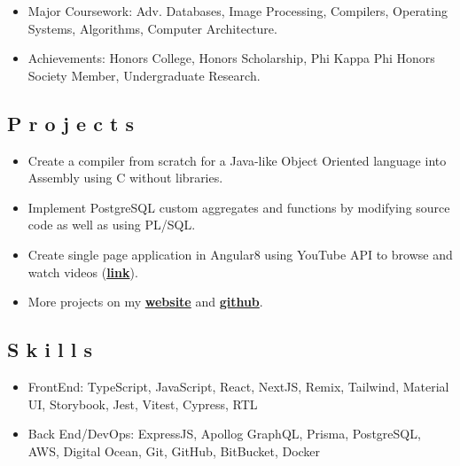 \documentclass{resume}
\begin{document}
\begin{itemize}
\item \small Major Coursework: Adv. Databases, Image Processing, Compilers, Operating Systems, Algorithms, Computer Architecture.
\item \small Achievements: Honors College, Honors Scholarship, Phi Kappa Phi Honors Society Member, Undergraduate Research.
\end{itemize}


\subsection{P r o j e c t s}
\begin{itemize}
\item \small Create a compiler from scratch for a Java-like Object Oriented language into Assembly using C without libraries.
\item \small Implement PostgreSQL custom aggregates and functions by modifying source code as well as using PL/SQL.
\item \small Create single page application in Angular8 using YouTube API to browse and watch videos (\href{https://github.com/mushfiq814/youtube-data-api-dogVids}{\textbf{link}}).
\item \small More projects on my \href{https://mushfiqmahmud.com/html/projects}{\textbf{website}} and \href{https://github.com/mushfiq814}{\textbf{github}}.
\end{itemize}


\subsection{S k i l l s}
\begin{itemize}
\item \small FrontEnd: TypeScript, JavaScript, React, NextJS, Remix, Tailwind, Material UI, Storybook, Jest, Vitest, Cypress, RTL
\item \small Back End/DevOps: ExpressJS, Apollog GraphQL, Prisma, PostgreSQL, AWS, Digital Ocean, Git, GitHub, BitBucket, Docker
\end{itemize}

\end{document}
